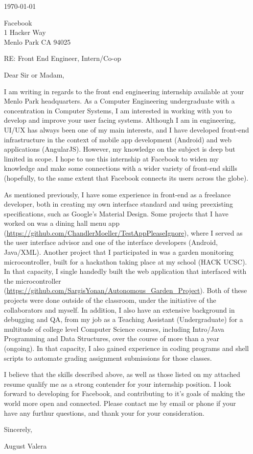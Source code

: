 \documentclass[11pt]{article}
\author{August Valera}
\begin{document}

\today

\vspace{12pt}
Facebook \\
1 Hacker Way \\
Menlo Park CA 94025

\vspace{12pt}

RE: Front End Engineer, Intern/Co-op

\vspace{12pt}
Dear Sir or Madam,

\vspace{12pt}
I am writing in regards to the front end engineering internship available at
your Menlo Park headquarters. As a Computer Engineering undergraduate with a
concentration in Computer Systems, I am interested in working with you to
develop and improve your user facing systems. Although I am in engineering,
UI/UX has always been one of my main interests, and I have developed front-end
infrastructure in the context of mobile app development (Android) and web
applications (AngularJS). However, my knowledge on the subject is deep but
limited in scope. I hope to use this internship at Facebook to widen my
knowledge and make some connections with a wider variety of front-end skills
(hopefully, to the same extent that Facebook connects its users across the
globe).

As mentioned previously, I have some experience in front-end as a freelance
developer, both in creating my own interface standard and using preexisting
specifications, such as Google's Material Design. Some projects that I have
worked on was a dining hall menu app
(\url{https://github.com/ChandlerMoeller/TestAppPleaseIgnore}), where I served
as the user interface advisor and one of the interface developers (Android,
Java/XML). Another project that I participated in was a garden monitoring
microcontroller, built for a hackathon taking place at my school (HACK UCSC). In
that capacity, I single handedly built the web application that interfaced with
the microcontroller
(\url{https://github.com/SargisYonan/Autonomous_Garden_Project}). Both of these
projects were done outside of the classroom, under the initiative of the
collaborators and myself. In addition, I also have an extensive background in
debugging and QA, from my job as a Teaching Assistant (Undergraduate) for a
multitude of college level Computer Science courses, including Intro/Java
Programming and Data Structures, over the course of more than a year (ongoing).
In that capacity, I also gained experience in coding programs and shell scripts
to automate grading assignment submissions for those classes.

I believe that the skills described above, as well as those listed on my
attached resume qualify me as a strong contender for your internship position. I
look forward to developing for Facebook, and contributing to it's goals of
making the world more open and connected. Please contact me by email or phone if
your have any furthur questions, and thank your for your consideration.

\vspace{12pt}
Sincerely,

\vspace{24pt}
August Valera
\end{document}
